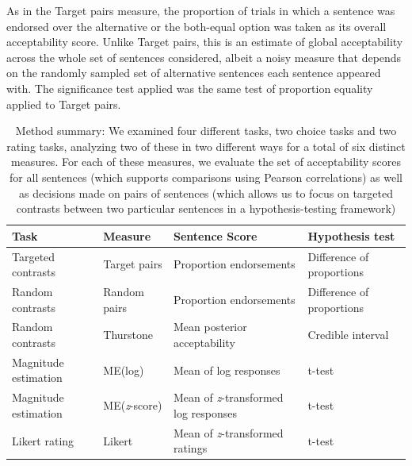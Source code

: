 \documentclass[doc]{apa6}
\newcommand{\targchoice}{{\sc Target pairs}}
\newcommand{\rndchoice}{{\sc Random pairs}}
\newcommand{\MElog}{{\sc ME{(log)}}}
\newcommand{\MEz}{{\sc ME{({\it z}-score)}}}
\newcommand{\thurstone}{{\sc Thurstone}}
\newcommand{\likert}{{\sc Likert}}
\newcommand{\choicetask}{choice task}
\newcommand{\ratingtask}{rating task}
\begin{document}
As in the \targchoice{} measure, the proportion of trials in which a sentence was endorsed over the alternative or the both-equal option was taken as its overall acceptability score. Unlike \targchoice, this is an estimate of global acceptability across the whole set of sentences considered, albeit a noisy measure that depends on the randomly sampled set of alternative sentences each sentence appeared with.
The significance test applied was the same test of proportion equality applied to \targchoice.


\begin{table}[t]
\begin{adjustwidth}{-2cm}{}
\begin{small}
\begin{tabular}{llll}
Task & Measure & Sentence Score & Hypothesis test \\
\hline
Targeted contrasts &\targchoice{} &Proportion endorsements & Difference of proportions\\ %
Random contrasts & \rndchoice{} & Proportion endorsements & Difference of proportions\\
Random contrasts & \thurstone{} & Mean posterior acceptability & Credible interval\\%
Magnitude estimation & \MElog{} & Mean of log responses & t-test\\
Magnitude estimation & \MEz{} & Mean of {\it z}-transformed log responses & t-test\\
Likert rating & \likert{} & Mean of {\it z}-transformed ratings & t-test\\
\end{tabular}
\caption{\small{Method summary: We examined four different tasks, two {\choicetask}s and two {\ratingtask}s, analyzing two of these in two different ways for a total of six distinct measures. For each of these measures, we evaluate the set of acceptability scores for all sentences (which supports comparisons using Pearson correlations) as well as decisions made on pairs of sentences (which allows us to focus on targeted contrasts between two particular sentences in a hypothesis-testing framework)}}
\label{tab:methods}
\end{small}
\end{adjustwidth}
\end{table}
\end{document}

